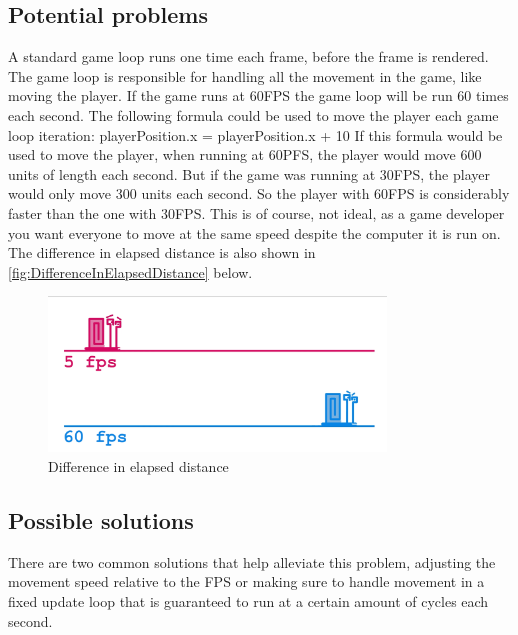 \documentclass{article} %
\begin{document}
\subsection{Potential problems}
A standard game loop runs one time each frame, before the frame is rendered.
The game loop is responsible for handling all the movement in the game, like moving the player.
If the game runs at 60FPS the game loop will be run 60 times each second.
\newline\newline
The following formula could be used to move the player each game loop iteration:
\newline
playerPosition.x = playerPosition.x + 10
\newline\newline
If this formula would be used to move the player, when running at 60PFS, the player would move 600 units of length each second.
But if the game was running at 30FPS, the player would only move 300 units each second.
So the player with 60FPS is considerably faster than the one with 30FPS.
This is of course, not ideal, as a game developer you want everyone to move at the same speed despite the computer it is run on.
The difference in elapsed distance is also shown in \autoref{fig:DifferenceInElapsedDistance} below.
\begin{figure}[h!]
    \centering
    \includegraphics[width=0.8\textwidth]{difference_in_distance.png}
    \caption{Difference in elapsed distance}
    \label{fig:DifferenceInElapsedDistance}
\end{figure}

\subsection{Possible solutions}
There are two common solutions that help alleviate this problem, adjusting the movement speed relative to the FPS or making sure to handle movement in a fixed update loop that is guaranteed to run at a certain amount of cycles each second.
\end{document}
